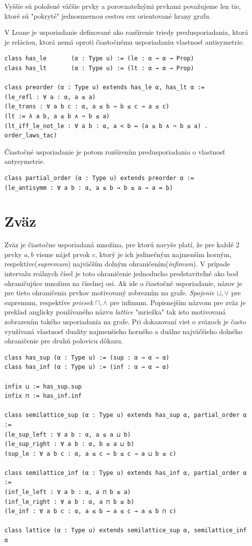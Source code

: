 \documentclass[a4paper,10pt,oneside]{report}%
\begin{document}
    Vyššie sú položené väčšie prvky a porovnateľnými prvkami považujeme len tie,
ktoré sú "pokryté" jednosmernou cestou cez orientované hrany grafu.

    V Leane je usporiadanie definované ako rozšírenie triedy predusporiadania, ktorá
je reláciou, ktorá nemá oproti čiastočnému usporiadaniu vlastnosť antisymetrie.

\begin{lstlisting}
class has_le       (α : Type u) := (le : α → α → Prop)
class has_lt       (α : Type u) := (lt : α → α → Prop)

class preorder (α : Type u) extends has_le α, has_lt α :=
(le_refl : ∀ a : α, a ≤ a)
(le_trans : ∀ a b c : α, a ≤ b → b ≤ c → a ≤ c)
(lt := λ a b, a ≤ b ∧ ¬ b ≤ a)
(lt_iff_le_not_le : ∀ a b : α, a < b ↔ (a ≤ b ∧ ¬ b ≤ a) . order_laws_tac)
\end{lstlisting}
    Čiastočné usporiadanie je potom rozšírením predusporiadania o vlastnosť antysymetrie.
\begin{lstlisting}
class partial_order (α : Type u) extends preorder α :=
(le_antisymm : ∀ a b : α, a ≤ b → b ≤ a → a = b)
\end{lstlisting}

\section{Zväz}
    Zväz je čiastočne usporiadaná množina, pre ktorú navyše platí, že pre každé 2 prvky $a, b$
vieme nájsť prvok $c$, ktorý je ich jedinečným najmenším horným, respektíve(\emph{supremum})
najväčším dolným ohraničením(\emph{infimum}).
    V prípade intervalu reálnych čísel je toto ohraničenie jednoducho predstaviteľné
ako bod ohraničujúce množinu na číselnej osi.
    Ak ide o čiastočné usporiadanie, názov je pre tieto ohraničenia prvkov
motivovaný zobrezním na grafe.
    \emph{Spojenie} $\sqcup, \vee$ pre supremum, respektíve \emph{priesek} $\sqcap, \wedge$ pre infimum.
    Popisnejším názvom pre zväz je preklad anglicky používaného názvu \emph{lattice}
"mriežka" tak isto motivovaná zobrazením takého usporiadania na grafe.
    Pri dokazovaní viet o zväzoch je často využívaná vlastnosť duality najmenšieho
horného a duálne najväčšieho dolného ohraničenie pre druhú polovicu dôkazu.
\begin{lstlisting}
class has_sup (α : Type u) := (sup : α → α → α)
class has_inf (α : Type u) := (inf : α → α → α)

infix ⊔ := has_sup.sup
infix ⊓ := has_inf.inf

class semilattice_sup (α : Type u) extends has_sup α, partial_order α :=
(le_sup_left : ∀ a b : α, a ≤ a ⊔ b)
(le_sup_right : ∀ a b : α, b ≤ a ⊔ b)
(sup_le : ∀ a b c : α, a ≤ c → b ≤ c → a ⊔ b ≤ c)

class semilattice_inf (α : Type u) extends has_inf α, partial_order α :=
(inf_le_left : ∀ a b : α, a ⊓ b ≤ a)
(inf_le_right : ∀ a b : α, a ⊓ b ≤ b)
(le_inf : ∀ a b c : α, a ≤ b → a ≤ c → a ≤ b ⊓ c)

class lattice (α : Type u) extends semilattice_sup α, semilattice_inf α
\end{lstlisting}
\end{document}
